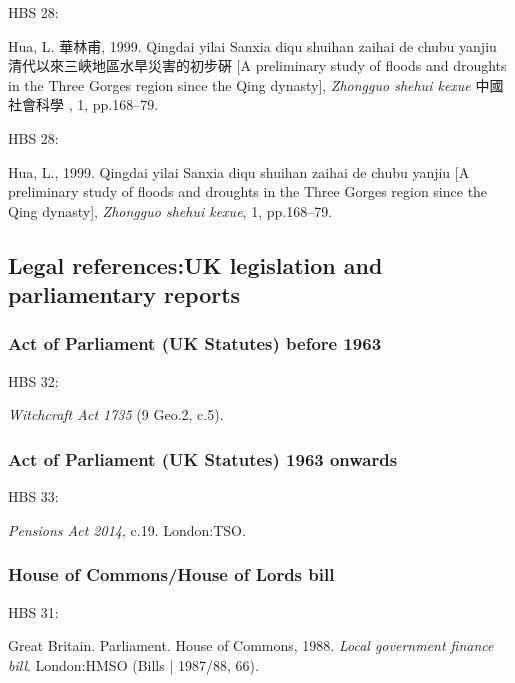 HBS 28: \cite{hua1999qys1}

Hua, L. 華林甫, 1999.  Qingdai yilai Sanxia diqu shuihan zaihai de chubu yanjiu 清代以來三峽地區水旱災害的初步硏 [A preliminary study of floods and droughts in the Three Gorges region since the Qing dynasty], \emph{Zhongguo shehui kexue} 中國社會科學 , 1, pp.168--79.


HBS 28: \cite{hua1999qys2}

Hua, L., 1999. Qingdai yilai Sanxia diqu shuihan zaihai de chubu yanjiu [A preliminary study of floods and droughts in the Three Gorges region since the Qing dynasty], \emph{Zhongguo shehui kexue}, 1, pp.168--79.



\subsection{Legal references:\@ UK legislation and parliamentary reports}


\subsubsection*{Act of Parliament (UK Statutes) before 1963}

HBS 32: \cite{gb.wa1735}

\emph{Witchcraft Act 1735} (9 Geo.2, c.5).



\subsubsection*{Act of Parliament (UK Statutes) 1963 onwards}

HBS 33: \cite{gb.pa2014}

\emph{Pensions Act 2014}, c.19. London:\@ TSO.



\subsubsection*{House of Commons/House of Lords bill}

HBS 31: \cite{gb.bill1987/88-66}

Great Britain. Parliament. House of Commons, 1988. \emph{Local government finance bill}. London:\@ HMSO (Bills | 1987/88, 66).




